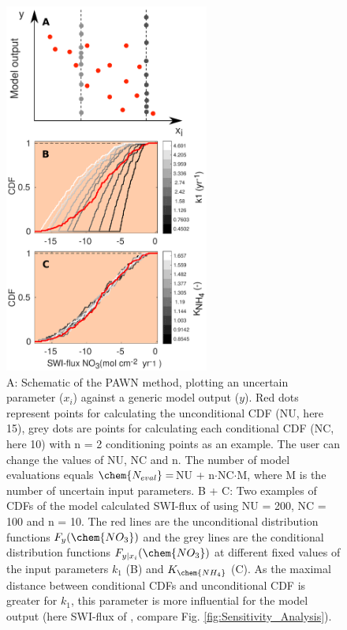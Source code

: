 \documentclass[gmd, manuscript]{copernicus}
\begin{document}
\begin{figure}[htbp]
\begin{center}
	\includegraphics[width=0.6\textwidth]{figures/SA/00_CDFs_400m_NO_3_1807.pdf}
	\caption{A: Schematic of the PAWN method, plotting an uncertain parameter ($x_i$) against a generic model output ($y$). 
	Red dots represent points for calculating the unconditional CDF (NU, here 15), grey dots are points for calculating each conditional CDF (NC, here 10) 
	with n = 2 conditioning points as an example. The user can change the values of NU, NC and n. The number of model evaluations equals $\chem{N_{eval}} = $NU + n$\cdot$NC$\cdot$M, 
	where M is the number of uncertain input parameters. 
	B + C: Two examples of CDFs of the model calculated SWI-flux of  using NU = 200, NC = 100 and n = 10. 
	The red lines are the unconditional distribution functions $F_y(\chem{NO_3})$ and the grey lines are the conditional distribution functions $F_{y|x_i}(\chem{NO_3})$ 
	at different fixed values of the input parameters $k_1$ (B) and $K_{\chem{NH_4}}$ (C). 
	As the maximal distance between conditional CDFs and unconditional CDF is greater for $k_1$, this parameter is more influential for the model output 
	(here SWI-flux of , compare Fig. \ref{fig:Sensitivity_Analysis}). 
	}
	\label{fig:Sensitivity_Analysis_methodology}
	\end{center}
\end{figure}
\end{document}
